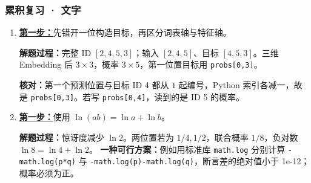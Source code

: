 \subsubsection*{累积复习 · 文字}
\begin{enumerate}[label={},leftmargin=4.8em,itemsep=4pt]
\item[\textbf{R-05.}] \leavevmode{}\label{solution:R-05}\label{solution:review-token-pipeline}\hyperref[exercise:review-token-pipeline]{\textbf{第一步：}}先错开一位构造目标，再区分词表轴与特征轴。\par\nobreak\textbf{解题过程：}完整 ID $[2,4,5,3]$；输入 $[2,4,5]$、目标 $[4,5,3]$。三维 Embedding 后 $3\times3$，概率 $3\times5$，第一位置目标用 \texttt{probs[0,3]}。\par\textbf{核对：}第一个预测位置与目标 ID 4 都从 $1$ 起编号，Python 索引各减一，故是 \texttt{probs[0,3]}。若写 \texttt{probs[0,4]}，读到的是 ID 5 的概率。
\item[\textbf{R-06.}] \leavevmode{}\label{solution:R-06}\label{solution:review-cross-entropy}\hyperref[exercise:review-cross-entropy]{\textbf{第一步：}}使用 $\ln(ab)=\ln a+\ln b$。\par\nobreak\textbf{解题过程：}惊讶度减少 $\ln2$。两位置若为 $1/4,1/2$，联合概率 $1/8$，负对数 $\ln8=\ln4+\ln2$。
\textbf{一种可行方案：}例如用标准库 \texttt{math.log} 分别计算 \texttt{-math.log(p*q)} 与 \texttt{-math.log(p)-math.log(q)}，断言差的绝对值小于 1e-12；概率必须为正。
\end{enumerate}
